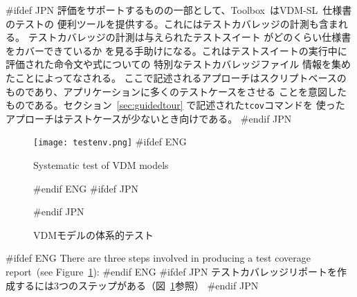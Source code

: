 \documentclass[\pformat,12pt]{article}
\newcommand{\vdmslpp}{VDM-SL}
\newcommand{\Toolbox}{Toolbox}
\newcommand{\vdmslpp}{VDM++}
\newcommand{\Toolbox}{Toolbox}
\begin{document}
#ifdef JPN
評価をサポートするものの一部として、\Toolbox\ は\vdmslpp\ 仕様書のテストの
便利ツールを提供する。これにはテストカバレッジの計測も含まれる。
テストカバレッジの計測は与えられたテストスイート
 がどのくらい仕様書をカバーできているか
を見る手助けになる。これはテストスイートの実行中に評価された命令文や式についての
特別なテストカバレッジファイル 情報を集めたことによってなされる。
ここで記述されるアプローチはスクリプトベースのものであり、アプリケーションに多くのテストケースをさせる
ことを意図したものである。セクション~\ref{sec:guidedtour} で記述された\texttt{tcov}コマンドを
使ったアプローチはテストケースが少ないとき向けである。
#endif JPN

\begin{figure}[tbh]
\begin{center}
\texttt{[image: testenv.png]}
#ifdef ENG
\caption{Systematic test of VDM models}
#endif ENG
#ifdef JPN
\caption{VDMモデルの体系的テスト}
#endif JPN
\label{fig:testenv}
\end{center}
\end{figure}

#ifdef ENG
There are three steps involved in producing a test coverage
report~(see Figure~\ref{fig:testenv}):
#endif ENG
#ifdef JPN
テストカバレッジリポートを作成するには3つのステップがある（図~\ref{fig:testenv}参照）
#endif JPN
\end{document}
